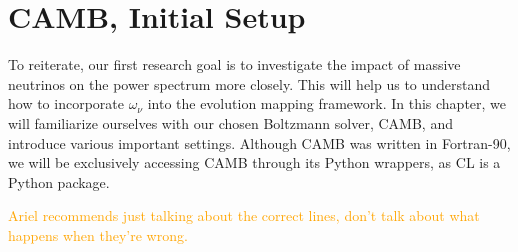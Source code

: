 \chapter{CAMB, Initial Setup}
\label{chap: CAMB_setup}

To reiterate, our first research goal is to investigate the impact of massive
neutrinos on the power spectrum more closely. This will help us to understand
how to incorporate $\omega_\nu$ into the evolution mapping framework.
In this chapter, we will familiarize ourselves with our chosen Boltzmann 
solver, CAMB, and introduce various important settings. Although CAMB was
written in Fortran-90, we will be exclusively accessing CAMB through its
Python wrappers, as CL is a Python package. 

\begin{comment}
\textcolor{blue}{
I hope to, in painstaking detail, cover many of the lines of the code that I
have written to interface with CAMB. I will include plots to indicate, at
every step, what incorrect settings cause the power spectrum to look like (or,
for subtler errors, what the error curves looked like compared to Ariel's
results, which I treated as a sort of ``ground truth''). This should also be a
good example to flex my physics interpretation skills: why does this incorrect
setting produce this undesired pattern?}

\textcolor{blue}{You might think that this is sort of an inappropriate 
section
for a master's thesis (especially since I have in mind that this be a lengthy 
section), but I would like to include it unless you feel very strongly. After
all, I spent several months of the project debugging at least ten different 
ways that slight and major errors in the various settings led to 
irreconcilable results.}
\end{comment}

\textcolor{orange}{Ariel recommends
just talking about the correct lines, don't talk about what happens when
they're wrong.}

\begin{comment}
In figure \ref{fig: spectrum_type}, we can see that requesting of the wrong
power spectrum type can in some low-$\omega_\nu$ cases yields errors so low
that we might accidentally overlook them. This error pattern is easily
recognizable and is a consequence of the definition of the power spectrum: the
Fourier transform  of the two-point correlation function. ...Okay, I'm still 
thinking about this. I don't understand %
\end{comment}

